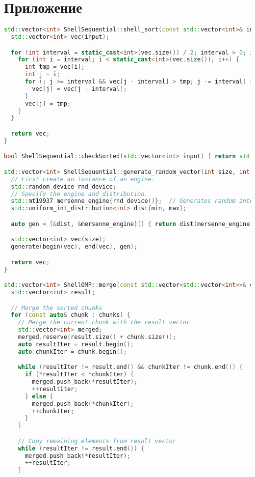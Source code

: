 \documentclass[]{article}
\theoremstyle{remark}
\theoremstyle{definition}
\begin{document}
\newpage

\section{Приложение}

\begin{lstlisting}[language=C++]
std::vector<int> ShellSequential::shell_sort(const std::vector<int>& input) {
  std::vector<int> vec(input);

  for (int interval = static_cast<int>(vec.size()) / 2; interval > 0; interval /= 2) {
    for (int i = interval; i < static_cast<int>(vec.size()); i++) {
      int tmp = vec[i];
      int j = i;
      for (; j >= interval && vec[j - interval] > tmp; j -= interval) {
        vec[j] = vec[j - interval];
      }
      vec[j] = tmp;
    }
  }

  return vec;
}

bool ShellSequential::checkSorted(std::vector<int> input) { return std::is_sorted(input.begin(), input.end()); }

std::vector<int> ShellSequential::generate_random_vector(int size, int min, int max) {
  // First create an instance of an engine.
  std::random_device rnd_device;
  // Specify the engine and distribution.
  std::mt19937 mersenne_engine{rnd_device()};  // Generates random integers
  std::uniform_int_distribution<int> dist{min, max};

  auto gen = [&dist, &mersenne_engine]() { return dist(mersenne_engine); };

  std::vector<int> vec(size);
  generate(begin(vec), end(vec), gen);

  return vec;
}

std::vector<int> ShellOMP::merge(const std::vector<std::vector<int>>& chunks) {
  std::vector<int> result;

  // Merge the sorted chunks
  for (const auto& chunk : chunks) {
    // Merge the current chunk with the result vector
    std::vector<int> merged;
    merged.reserve(result.size() + chunk.size());
    auto resultIter = result.begin();
    auto chunkIter = chunk.begin();

    while (resultIter != result.end() && chunkIter != chunk.end()) {
      if (*resultIter < *chunkIter) {
        merged.push_back(*resultIter);
        ++resultIter;
      } else {
        merged.push_back(*chunkIter);
        ++chunkIter;
      }
    }

    // Copy remaining elements from result vector
    while (resultIter != result.end()) {
      merged.push_back(*resultIter);
      ++resultIter;
    }


\end{lstlisting}
\end{document}
